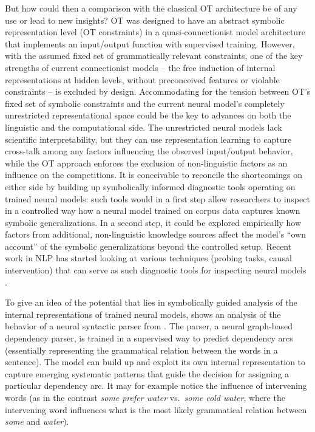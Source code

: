 \documentclass[output=paper,hidelinks]{langscibook}
\begin{document}
But how could then a comparison with the classical OT architecture be of any use or lead to new insights? OT was designed to have an abstract symbolic representation level (OT constraints) in a quasi-connectionist model architecture that implements an input/output function with supervised training. However, with the assumed fixed set of grammatically relevant constraints, one of the key strengths of current connectionist models -- the free induction of internal representations at hidden levels, without preconceived features or violable constraints -- is excluded by design.  Accommodating for the tension between OT's fixed set of symbolic constraints and the current neural model's completely unrestricted representational space could be the key to advances on both the linguistic and the computational side. The unrestricted neural models lack scientific interpretability, but they can use representation learning to capture cross-talk among any factors influencing the observed input/output behavior, while the OT approach enforces the exclusion of non-linguistic factors as an influence on the competitions. It is conceivable to reconcile the shortcomings on either side by building up symbolically informed diagnostic tools operating on trained neural models: such tools would in a first step allow researchers to inspect in a controlled way how a neural model trained on corpus data captures known symbolic generalizations. In a second step, it could be explored empirically how factors from additional, non-linguistic knowledge sources affect the model's ``own account'' of the symbolic generalizations beyond the controlled setup.
Recent work in NLP has started looking at various techniques (probing tasks, causal intervention) that can serve as such diagnostic tools for inspecting neural models \citep{ettinger-etal-2016-probing,gulordava-etal-2018-colorless}.

To give an idea of the potential that lies in symbolically guided analysis of the internal representations of trained neural models,  shows an analysis of the behavior of a neural syntactic parser from \citet{FalenskaKuhn2019}. The parser, a neural graph-based dependency parser, is trained in a supervised way to predict dependency arcs (essentially representing the grammatical relation between the words in a sentence). The model can build up and exploit its own internal representation to capture emerging systematic patterns that guide the decision for assigning a particular dependency arc. It may for example notice the influence of intervening words (as in the contrast \emph{some prefer water} vs.\ \emph{some cold water}, where the intervening word influences what is the most likely grammatical relation between \emph{some} and \emph{water}).
\end{document}
